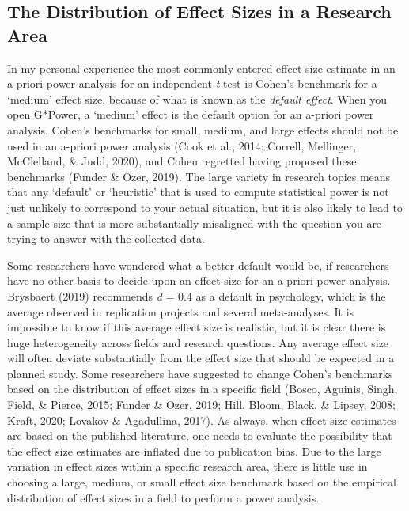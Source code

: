 \documentclass[
  english,
  ,jou, a4paper,floatsintext]{apa6}
\begin{document}
\hypertarget{the-distribution-of-effect-sizes-in-a-research-area}{%
\subsection{The Distribution of Effect Sizes in a Research Area}\label{the-distribution-of-effect-sizes-in-a-research-area}}

In my personal experience the most commonly entered effect size estimate in an a-priori power analysis for an independent \emph{t} test is Cohen's benchmark for a `medium' effect size, because of what is known as the \emph{default effect}. When you open G*Power, a `medium' effect is the default option for an a-priori power analysis. Cohen's benchmarks for small, medium, and large effects should not be used in an a-priori power analysis (Cook et al., 2014; Correll, Mellinger, McClelland, \& Judd, 2020), and Cohen regretted having proposed these benchmarks (Funder \& Ozer, 2019). The large variety in research topics means that any `default' or `heuristic' that is used to compute statistical power is not just unlikely to correspond to your actual situation, but it is also likely to lead to a sample size that is more substantially misaligned with the question you are trying to answer with the collected data.

Some researchers have wondered what a better default would be, if researchers have no other basis to decide upon an effect size for an a-priori power analysis. Brysbaert (2019) recommends \emph{d} = 0.4 as a default in psychology, which is the average observed in replication projects and several meta-analyses. It is impossible to know if this average effect size is realistic, but it is clear there is huge heterogeneity across fields and research questions. Any average effect size will often deviate substantially from the effect size that should be expected in a planned study. Some researchers have suggested to change Cohen's benchmarks based on the distribution of effect sizes in a specific field (Bosco, Aguinis, Singh, Field, \& Pierce, 2015; Funder \& Ozer, 2019; Hill, Bloom, Black, \& Lipsey, 2008; Kraft, 2020; Lovakov \& Agadullina, 2017). As always, when effect size estimates are based on the published literature, one needs to evaluate the possibility that the effect size estimates are inflated due to publication bias. Due to the large variation in effect sizes within a specific research area, there is little use in choosing a large, medium, or small effect size benchmark based on the empirical distribution of effect sizes in a field to perform a power analysis.
\end{document}
